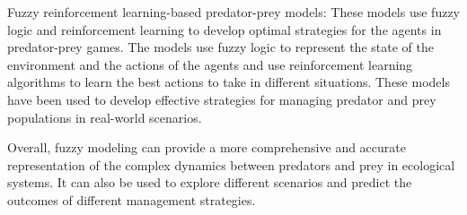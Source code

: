 Fuzzy reinforcement learning-based predator-prey models: These models use fuzzy logic and reinforcement learning to develop optimal strategies for the agents in predator-prey games. The models use fuzzy logic to represent the state of the environment and the actions of the agents and use reinforcement learning algorithms to learn the best actions to take in different situations. These models have been used to develop effective strategies for managing predator and prey populations in real-world scenarios.

Overall, fuzzy modeling can provide a more comprehensive and accurate representation of the complex dynamics between predators and prey in ecological systems. It can also be used to explore different scenarios and predict the outcomes of different management strategies.
